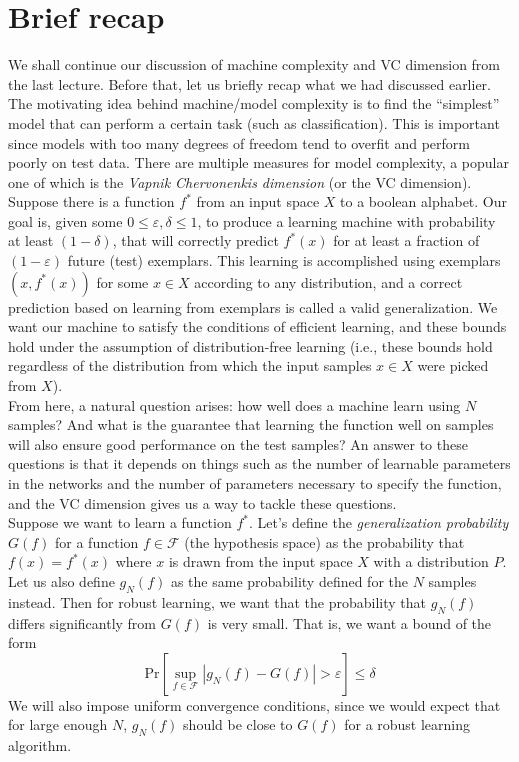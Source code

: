 \documentclass[11pt]{article}
\newcommand{\nl}{\vspace*{0.3cm}\\}
\begin{document}
\section{Brief recap}
We shall continue our discussion of machine complexity and VC dimension from the last lecture. Before that, let us briefly recap what we had discussed earlier.\nl
The motivating idea behind machine/model complexity is to find the ``simplest'' model that can perform a certain task (such as classification). This is important since models with too many degrees
of freedom tend to overfit and perform poorly on test data. There are multiple measures for model complexity, a popular one of which is the \emph{Vapnik Chervonenkis dimension} (or the VC
dimension).\nl
Suppose there is a function $f^*$ from an input space $X$ to a boolean alphabet. Our goal is, given some $0 \le \varepsilon, \delta \le 1$, to produce a learning machine with probability at least $(1
- \delta)$, that will correctly predict $f^*(x)$ for at least a fraction of $(1 - \varepsilon)$ future (test) exemplars. This learning is accomplished using exemplars $(x, f^*(x))$ for some $x
\in X$ according to any distribution, and a correct prediction based on learning from exemplars is called a valid generalization. We want our machine to satisfy the conditions of efficient
learning, and these bounds hold under the assumption of distribution-free learning (i.e., these bounds hold regardless of the distribution from which the input samples $x \in X$ were picked
from $X$).
\nl
From here, a natural question arises: how well does a machine learn using $N$ samples? And what is the guarantee that learning the function well on samples will also ensure good performance on
the test samples? An answer to these questions is that it depends on things such as the number of learnable parameters in the networks and the number of parameters necessary to specify the
function, and the VC dimension gives us a way to tackle these questions.\nl
Suppose we want to learn a function $f^*$. Let's define the \emph{generalization probability} $G(f)$ for a function $f \in \mathcal{F}$ (the hypothesis space) as the probability that $f(x) = f^*(x)$ where $x$ is drawn from the input space $X$ with a
distribution $P$. Let us also define $g_N(f)$ as the same probability defined for the $N$ samples instead. Then for robust learning, we want that the probability that $g_N(f)$ differs
significantly from $G(f)$ is very small. That is, we want a bound of the form \[\mathrm{Pr}[\sup_{f \in \mathcal{F}}|g_N(f) - G(f)| > \varepsilon] \le \delta\]
We will also impose uniform convergence conditions, since we would expect that for large enough $N$, $g_N(f)$ should be close to $G(f)$ for a robust learning algorithm.
\end{document}
